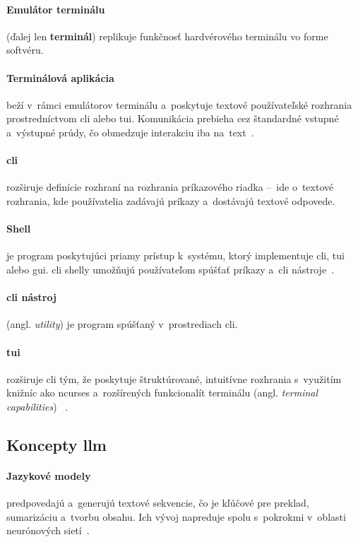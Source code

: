 \paragraph{Emulátor terminálu} (ďalej len \textbf{terminál}) replikuje funkčnosť hardvérového terminálu vo forme softvéru.

\paragraph{Terminálová aplikácia} beží v~rámci emulátorov terminálu a~poskytuje textové používateľské rozhrania prostredníctvom \gls{cli} alebo \gls{tui}. Komunikácia prebieha cez štandardné vstupné a~výstupné prúdy, čo obmedzuje interakciu iba na~text~\cite{man_man,linfo_terminal}.

\paragraph{\gls{cli}} rozširuje definície rozhraní na rozhrania príkazového riadka –~ide o~textové rozhrania, kde používatelia zadávajú príkazy a~dostávajú textové odpovede.

\paragraph{Shell} je program poskytujúci priamy prístup k~systému, ktorý implementuje \gls{cli}, \gls{tui} alebo \gls{gui}. \gls{cli} shelly umožňujú používateľom spúšťať príkazy a~\gls{cli} nástroje~\cite{linfo_terminal}.

\paragraph{\gls{cli} nástroj} (angl. \textsl{utility}) je program spúšťaný v~prostrediach \gls{cli}.

\paragraph{\gls{tui}} rozširuje \gls{cli} tým, že poskytuje štruktúrované, intuitívne rozhrania s~využitím knižníc ako ncurses a~rozšírených funkcionalít terminálu (angl. \textsl{terminal capabilities}) ~\cite{linfo_terminal}.
\subsection*{Koncepty \gls{llm}}

\paragraph{Jazykové modely} predpovedajú a~generujú textové sekvencie, čo je kľúčové pre preklad, sumarizáciu a~tvorbu obsahu. Ich vývoj napreduje spolu s~pokrokmi v~oblasti neurónových sietí~\cite{naveed2023}.

